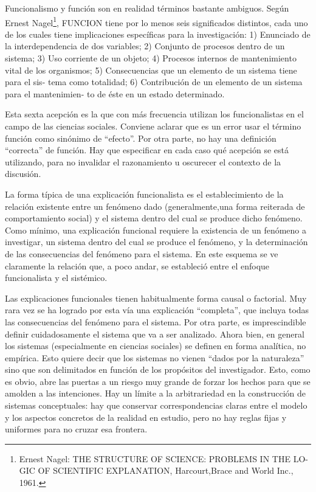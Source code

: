 \documentclass[
]{book}
\begin{document}
Funcionalismo y función son en realidad términos bastante ambiguos. Según Ernest Nagel\footnote{Ernest Nagel: THE STRUCTURE OF SCIENCE: PROBLEMS IN THE LO- GIC OF SCIENTIFIC EXPLANATION, Harcourt,Brace and World Inc., 1961.}, FUNCION tiene por lo menos seis significados distintos, cada uno de los cuales tiene implicaciones específicas para la investigación: 1) Enunciado de la interdependencia de dos variables; 2) Conjunto de procesos dentro de un sistema; 3) Uso corriente de un objeto; 4) Procesos internos de mantenimiento vital de los organismos; 5) Consecuencias que un elemento de un sistema tiene para el sis- tema como totalidad; 6) Contribución de un elemento de un sistema para el mantenimien- to de éste en un estado determinado.

Esta sexta acepción es la que con más frecuencia utilizan los funcionalistas en el campo de las ciencias sociales. Conviene aclarar que es un error usar el término función como sinónimo de ``efecto''. Por otra parte, no hay una definición ``correcta'' de función. Hay que especificar en cada caso qué acepción se está utilizando, para no invalidar el razonamiento u oscurecer el contexto de la discusión.

La forma típica de una explicación funcionalista es el establecimiento de la relación existente entre un fenómeno dado (generalmente,una forma reiterada de comportamiento social) y el sistema dentro del cual se produce dicho fenómeno. Como mínimo, una explicación funcional requiere la existencia de un fenómeno a investigar, un sistema dentro del cual se produce el fenómeno, y la determinación de las consecuencias del fenómeno para el sistema. En este esquema se ve claramente la relación que, a poco andar, se estableció entre el enfoque funcionalista y el sistémico.

Las explicaciones funcionales tienen habitualmente forma causal o factorial. Muy rara vez se ha logrado por esta vía una explicación ``completa'', que incluya todas las consecuencias del fenómeno para el sistema. Por otra parte, es imprescindible definir cuidadosamente el sistema que va a ser analizado. Ahora bien, en general los sistemas (especialmente en ciencias sociales) se definen en forma analítica, no empírica. Esto quiere decir que los sistemas no vienen ``dados por la naturaleza'' sino que son delimitados en función de los propósitos del investigador. Esto, como es obvio, abre las puertas a un riesgo muy grande de forzar los hechos para que se amolden a las intenciones. Hay un límite a la arbitrariedad en la construcción de sistemas conceptuales: hay que conservar correspondencias claras entre el modelo y los aspectos concretos de la realidad en estudio, pero no hay reglas fijas y uniformes para no cruzar esa frontera.
\end{document}
